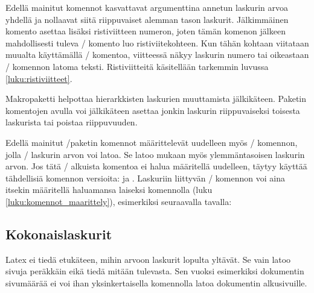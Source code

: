 Edellä mainitut komennot kasvattavat argumenttina annetun laskurin arvoa
yhdellä ja nollaavat siitä riippuvaiset alemman tason laskurit.
Jälkimmäinen komento  asettaa lisäksi
ristiviitteen numeron, joten tämän komenon jälkeen mahdollisesti tuleva
\-/ komento luo ristiviitekohteen. Kun tähän kohtaan
viitataan muualta käyttämällä \-/ komentoa, viitteessä
näkyy laskurin numero tai oikeastaan \-/ komennon
latoma teksti. Ristiviitteitä käsitellään tarkemmin luvussa
\ref{luku:ristiviitteet}.

Makropaketti  helpottaa
hierarkkisten laskurien muuttamista jälkikäteen. Paketin komentojen
avulla voi jälkikäteen asettaa jonkin laskurin riippuvaiseksi toisesta
laskurista tai poistaa riippuvuuden.

\begin{koodilohkosis}
\end{koodilohkosis}

Edellä mainitut \-/paketin komennot määrittelevät
uudelleen myös \-/ komennon, jolla \-/
laskurin arvon voi latoa. Se latoo mukaan myös ylemmäntasoisen laskurin
arvon. Jos tätä \-/ alkuista komentoa ei halua määritellä
uudelleen, täytyy käyttää tähdellisiä komennon versioita:
 ja . Laskuriin
liittyvän \-/ komennon voi aina itsekin määritellä
haluamansa laiseksi komennolla  (luku
\ref{luku:komennot_maarittely}), esimerkiksi seuraavalla tavalla:

\begin{koodilohkosis}
\renewcommand{\theoma}{\arabic{page}/\alph{oma}}
\end{koodilohkosis}

\subsection{Kokonaislaskurit}

Latex ei tiedä etukäteen, mihin arvoon laskurit lopulta yltävät. Se vain
latoo sivuja peräkkäin eikä tiedä mitään tulevasta. Sen vuoksi
esimerkiksi dokumentin sivumäärää ei voi ihan yksinkertaisella
komennolla latoa dokumentin alkusivuille.

